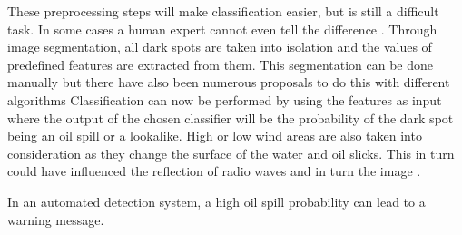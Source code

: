 These preprocessing steps will make classification easier, but is still a difficult task. In some cases a human expert cannot even tell the difference \cite{Keramitsoglou2006640}. Through image segmentation, all dark spots are taken into isolation and the values of predefined features are extracted from them. This segmentation can be done manually but there have also been numerous proposals to do this with different algorithms \cite{ma2011sar,fjortoft1998optimal, ye2002wavelet} Classification can now be performed by using the features as input where the output of the chosen classifier will be the probability of the dark spot being an oil spill or a lookalike. 
High or low wind areas are also taken into consideration as they change the surface of the water and oil slicks. This in turn could have influenced the reflection of radio waves and in turn the image \cite{fingas2014review}.

In an automated detection system, a high oil spill probability can lead to a warning message.


